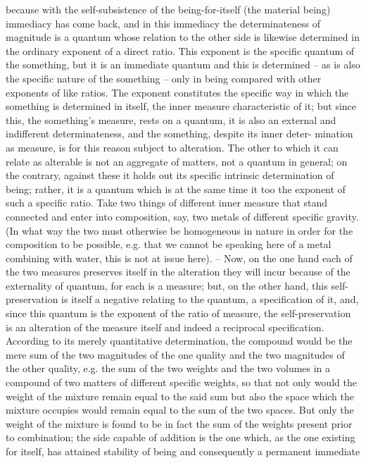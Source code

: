 because with the self-subsistence of the being-for-itself (the material being)
immediacy has come back, and in this immediacy the determinateness
of magnitude is a quantum whose relation to the other side is likewise
determined in the ordinary exponent of a direct ratio.
This exponent is the specific quantum of the something, but it is an
immediate quantum and this is determined – as is also the specific nature
of the something – only in being compared with other exponents of like
ratios. The exponent constitutes the specific way in which the something is
determined in itself, the inner measure characteristic of it; but since this,
the something’s measure, rests on a quantum, it is also an external and
indifferent determinateness, and the something, despite its inner deter-
mination as measure, is for this reason subject to alteration. The other to
which it can relate as alterable is not an aggregate of matters, not a quantum
in general; on the contrary, against these it holds out its specific intrinsic
determination of being; rather, it is a quantum which is at the same time
it too the exponent of such a specific ratio. Take two things of different
inner measure that stand connected and enter into composition, say, two
metals of different specific gravity. (In what way the two must otherwise
be homogeneous in nature in order for the composition to be possible, e.g.
that we cannot be speaking here of a metal combining with water, this is not
at issue here). – Now, on the one hand each of the two measures preserves
itself in the alteration they will incur because of the externality of quantum,
for each is a measure; but, on the other hand, this self-preservation is itself
a negative relating to the quantum, a specification of it, and, since this
quantum is the exponent of the ratio of measure, the self-preservation is
an alteration of the measure itself and indeed a reciprocal specification.
According to its merely quantitative determination, the compound
would be the mere sum of the two magnitudes of the one quality and
the two magnitudes of the other quality, e.g. the sum of the two weights
and the two volumes in a compound of two matters of different specific
weights, so that not only would the weight of the mixture remain equal to
the said sum but also the space which the mixture occupies would remain
equal to the sum of the two spaces. But only the weight of the mixture is
found to be in fact the sum of the weights present prior to combination;
the side capable of addition is the one which, as the one existing for itself,
has attained stability of being and consequently a permanent immediate
